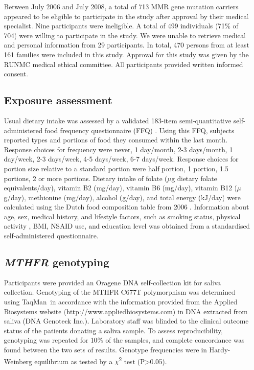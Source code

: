 \noindent Between July 2006 and July 2008, a total of 713 MMR gene mutation carriers appeared to be eligible to participate in the study after approval by their medical specialist. Nine participants were ineligible. A total of 499 individuals (71\% of 704) were willing to participate in the study. We were unable to retrieve medical and personal information from 29 participants. In total, 470 persons from at least 161 families were included in this study. Approval for this study was given by the RUNMC medical ethical committee. All participants provided written informed consent.

\subsection{Exposure assessment} %
\noindent Usual dietary intake was assessed by a validated 183-item semi-quantitative self-administered food frequency questionnaire (FFQ) \cite{c628,c629}. Using this FFQ, subjects reported types and portions of food they consumed within the last month. Response choices for frequency were never, 1 day/month, 2-3 days/month, 1 day/week, 2-3 days/week, 4-5 days/week, 6-7 days/week. Response choices for portion size relative to a standard portion were half portion, 1 portion, 1.5 portions, 2 or more portions. Dietary intake of folate ($\mu$g dietary folate equivalents/day), vitamin B2 (mg/day), vitamin B6 (mg/day), vitamin B12 ($\mu$g/day), methionine (mg/day), alcohol (g/day), and total energy (kJ/day) were calculated using the Dutch food composition table from 2006 \cite{c630}. Information about age, sex, medical history, and lifestyle factors, such as smoking status, physical activity \cite{c631}, BMI, NSAID use, and education level was obtained from a standardised self-administered questionnaire.

\subsection{\emph{MTHFR} genotyping} %
\noindent Participants were provided an Oragene DNA self-collection kit for saliva collection. Genotyping of the MTHFR C677T polymorphism was determined using TaqMan\textsuperscript{\textregistered}~in accordance with the information provided from the Applied Biosystems website (http://www.appliedbiosystems.com) in DNA extracted from saliva (DNA Genoteck Inc.). Laboratory staff was blinded to the clinical outcome status of the patients donating a saliva sample. To assess reproducibility, genotyping was repeated for 10\% of the samples, and complete concordance was found between the two sets of results. Genotype frequencies were in Hardy-Weinberg equilibrium as tested by a $\chi$\textsuperscript{2} test (P>0.05).

